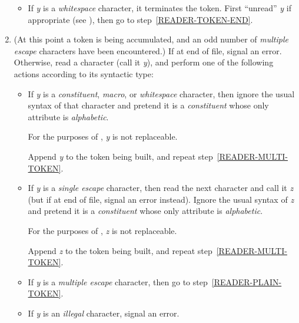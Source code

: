 \begin{enumerate}
\begin{itemize}
\item
If \emph{y} is a \emph{whitespace} character, it terminates
the token.  First ``unread'' \emph{y}
if appropriate (see ),
then go to step~\ref{READER-TOKEN-END}.
\end{itemize}

\item
(At this point a token is being accumulated, and an odd number
of \emph{multiple escape} characters have been encountered.)
If at end of file, signal an error.
Otherwise, read a character (call it \emph{y}), and
perform one of the following actions according to its syntactic type:
\label{READER-MULTI-TOKEN}
\begin{itemize}
\item
If \emph{y} is a \emph{constituent}, \emph{macro}, or \emph{whitespace}
character, then ignore the usual syntax of that character
and pretend it is a \emph{constituent} whose only attribute is
\emph{alphabetic}.

For the purposes of , \emph{y} is not replaceable.

Append \emph{y} to the token being built,
and repeat step~\ref{READER-MULTI-TOKEN}.

\item
If \emph{y} is a \emph{single escape} character, then read the next character
and call it \emph{z}
(but if at end of file, signal an error instead).
Ignore the usual syntax of \emph{z}
and pretend it is a \emph{constituent} whose only attribute is
\emph{alphabetic}.

For the purposes of , \emph{z} is not replaceable.

Append \emph{z} to the token being built,
and repeat step~\ref{READER-MULTI-TOKEN}.

\item
If \emph{y} is a \emph{multiple escape} character,
then go to step~\ref{READER-PLAIN-TOKEN}.

\item
If \emph{y} is an \emph{illegal} character, signal an error.
\end{itemize}


\end{enumerate}
